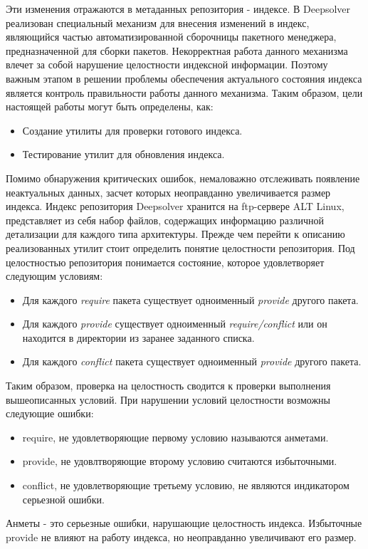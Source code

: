 \documentclass[a4paper]{article}
\begin{document}
Эти изменения отражаются в метаданных репозитория - индексе.
\newpage
В  Deepsolver реализован специальный механизм для внесения изменений в индекс,
являющийся частью автоматизированной сборочницы пакетного менеджера, 
предназначенной для сборки пакетов. Некорректная работа данного механизма влечет за собой 
нарушение целостности индексной информации. Поэтому важным этапом в решении 
проблемы обеспечения актуального состояния индекса является контроль правильности 
работы данного механизма. 
\newpage
Таким образом, цели настоящей работы могут быть определены, как:
\begin{itemize}
\item
Создание утилиты для проверки готового индекса.
\item
Тестирование утилит для обновления индекса.
\end{itemize}


Помимо обнаружения критических ошибок, немаловажно отслеживать появление 
неактуальных данных, засчет которых неоправданно увеличивается размер индекса. %
\newpage
Индекс репозитория Deepsolver хранится на ftp-сервере ALT Linux, представляет
из себя набор файлов, содержащих информацию различной детализации
для каждого типа архитектуры.
\newpage
Прежде чем перейти к описанию реализованных утилит стоит
определить понятие целостности репозитория. Под целостностью
репозитория понимается состояние, которое удовлетворяет следующим
условиям:
\begin{itemize}
\item{Для каждого \textit{require} пакета существует одноименный \textit{provide} 
другого пакета.  }
\item{Для каждого \textit{provide} существует одноименный \textit{require/conflict} или
он находится в директории из заранее заданного списка.}
\item{Для каждого \textit{conflict} пакета существует одноименный \textit{provide} 
другого пакета. }
\end{itemize}
Таким образом, проверка на целостность сводится к проверки выполнения вышеописанных
условий.
\newpage
При нарушении условий целостности возможны следующие ошибки:
\begin{itemize}
\item
require, не удовлетворяющие первому условию называются анметами.
\item
provide, не удовлтворяющие второму условию считаются избыточными.
\item
conflict, не удовлетворяющие третьему условию, не являются индикатором
серьезной ошибки.
\end{itemize}
Анметы - это серьезные ошибки, нарушающие целостность индекса. Избыточные
provide не влияют на работу индекса, но неоправданно увеличивают его размер.
\end{document}
